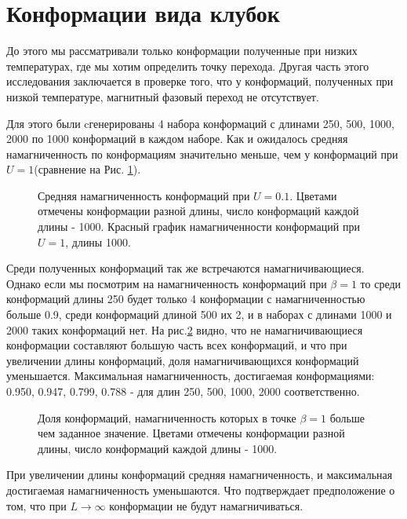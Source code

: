 \section{Конформации вида клубок}
До этого мы рассматривали только конформации полученные при низких температурах, где мы хотим определить точку перехода. Другая часть этого исследования заключается в проверке того, что у конформаций, полученных при низкой температуре, магнитный фазовый переход не отсутствует.

Для этого были cгенерированы 4 набора конформаций с длинами 250, 500, 1000, 2000 по 1000 конформаций в каждом наборе. Как и ожидалось средняя намагниченность по конформациям значительно меньше, чем у конформаций при $U = 1$(сравнение на Рис. \ref{fig:U0.1_mean_mag2}).

\begin{figure}[htb]
	\centering
	

	\caption{Средняя намагниченность конформаций при $U=0.1$. Цветами отмечены конформации разной длины, число конформаций каждой длины - 1000. Красный график намагниченности конформаций при $U=1$, длины 1000.}
	\label{fig:U0.1_mean_mag2}
\end{figure}

Среди полученных конформаций так же встречаются намагничивающиеся. Однако если мы посмотрим на намагниченность конформаций при $\beta = 1$ то среди конформаций длины 250 будет только 4 конформации с намагниченностью больше 0.9, среди конформаций длиной 500 их 2, и в наборах с длинами 1000 и 2000 таких конформаций нет. На рис.\ref{fig:fraction_magnetization} видно, что не намагничивающиеся конформации составляют большую часть всех конформаций, и что при увеличении длины конформаций, доля намагничивающихся конформаций уменьшается. Максимальная намагниченность, достигаемая конформациями: 0.950, 0.947, 0.799, 0.788 - для длин 250, 500, 1000, 2000 соответственно.

\begin{figure}[htb]
	\centering
	
	\caption{Доля конформаций, намагниченность которых в точке $\beta = 1$ больше чем заданное значение. Цветами отмечены конформации разной длины, число конформаций каждой длины - 1000.}
	\label{fig:fraction_magnetization}
\end{figure}

При увеличении длины конформаций средняя намагниченность, и максимальная достигаемая намагниченность уменьшаются. Что подтверждает предположение о том, что при $L\to \infty$ конформации не будут намагничиваться.


